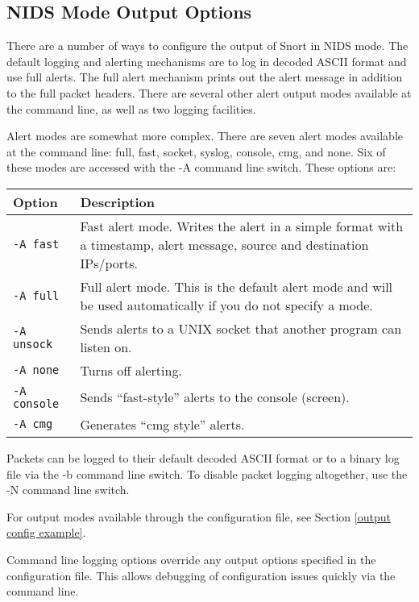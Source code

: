\documentclass[english]{report}
\newenvironment{note}{
\samepage
    \vspace{10pt}{\textsf{
        {\hspace{7pt}\Huge{$\triangle$\hspace{-12.5pt}{\Large{$^!$}}}}\hspace{5pt}
        {\Large{NOTE}}
    }
    }
   \begin{center}
    \par\vspace{-17pt}

    \begin{lrbox}{\savepar}
    \begin{minipage}[r]{6in}
}
{
    \end{minipage}
    \end{lrbox}
    \fbox{
        \usebox{
            \savepar
        }
    }
    \par\vskip10pt
    \end{center}
}
\begin{document}
\subsection{NIDS Mode Output Options}

There are a number of ways to configure the output of Snort in NIDS
mode. The default logging and alerting mechanisms are to log in decoded
ASCII format and use full alerts. The full alert
mechanism prints out the alert message in addition to the full packet
headers. There are several other alert output modes available at the
command line, as well as two logging facilities.

Alert modes are somewhat more complex. There are seven alert modes available
at the command line: full, fast, socket, syslog, console, cmg, and
none. Six of these modes are accessed with the -A command line switch.
These options are:

\begin{tabular}{| l | p{5.4in} |}
\hline
{\bf Option} & {\bf Description}\\
\hline
\hline
{\tt -A fast} & Fast alert mode. Writes the alert in a simple format with a timestamp, alert message, source
and destination IPs/ports.\\
\hline
{\tt -A full} & Full alert mode. This is the default alert mode and will be used automatically if you do not specify a mode.\\
\hline
{\tt -A unsock} & Sends alerts to a UNIX socket that another program can listen on.\\
\hline
{\tt -A none} & Turns off alerting.\\
\hline
{\tt -A console} & Sends ``fast-style'' alerts to the console (screen).\\
\hline
{\tt -A cmg} & Generates ``cmg style'' alerts.\\
\hline
\end{tabular}

Packets can be logged to their default decoded ASCII format or to
a binary log file via the -b command line switch. To disable
packet logging altogether, use the -N command line switch.

For output modes available through the configuration file, see Section
\ref{output config example}. 

\begin{note}
Command line logging options override any output options specified 
in the configuration file. This allows debugging of configuration 
issues quickly via the command line.
\end{note}
\end{document}
